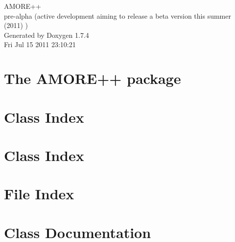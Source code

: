 \documentclass[a4paper]{book}
\begin{document}
\hypersetup{pageanchor=false}
\begin{titlepage}
\vspace*{7cm}
\begin{center}
{\Large AMORE++ \\[1ex]\large pre-\/alpha (active development aiming to release a beta version this summer (2011) ) }\\
\vspace*{1cm}
{\large Generated by Doxygen 1.7.4}\\
\vspace*{0.5cm}
{\small Fri Jul 15 2011 23:10:21}\\
\end{center}
\end{titlepage}
\clearemptydoublepage
{}
\tableofcontents
\clearemptydoublepage
{}
\hypersetup{pageanchor=true}
\chapter{The AMORE++ package}
\label{index}\hypertarget{index}{}
\chapter{Class Index}

\chapter{Class Index}

\chapter{File Index}

\chapter{Class Documentation}






















\end{document}
